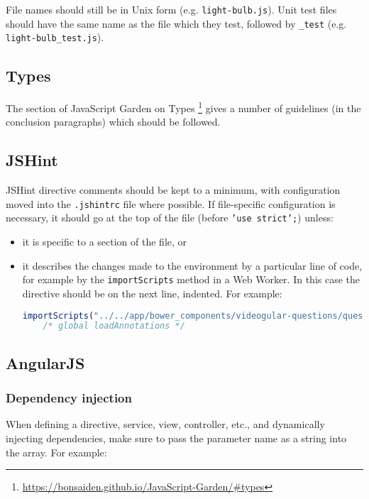 File names should still be in Unix form (e.g. \texttt{light-bulb.js}).
Unit test files should have the same name as the file which they test,
followed by \texttt{\_test} (e.g. \texttt{light-bulb\_test.js}).

\subsection{Types}

The section of JavaScript Garden on Types
\footnote{\url{https://bonsaiden.github.io/JavaScript-Garden/\#types}}
gives a number of guidelines (in the conclusion paragraphs) which should
be followed.

\subsection{JSHint}

JSHint directive comments should be kept to a minimum, with
configuration moved into the \texttt{.jshintrc} file where possible. If
file-specific configuration is necessary, it should go at the top of the
file (before \texttt{'use strict';}) unless:

\begin{itemize}
\item
  it is specific to a section of the file, or
\item
  it describes the changes made to the environment by a particular line
  of code, for example by the \texttt{importScripts} method in a Web
  Worker. In this case the directive should be on the next line,
  indented. For example:

\begin{lstlisting}[language=javascript]
importScripts("../../app/bower_components/videogular-questions/questions-worker.js");
    /* global loadAnnotations */
\end{lstlisting}
\end{itemize}

\subsection{AngularJS}

\subsubsection{Dependency injection}

When defining a directive, service, view, controller, etc., and
dynamically injecting dependencies, make sure to pass the parameter name
as a string into the array. For example:

